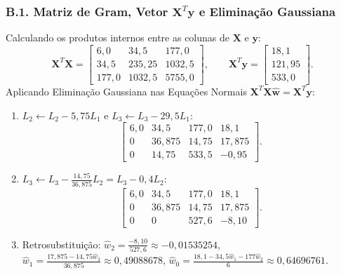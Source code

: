 \documentclass[11pt,a4paper]{article}
\begin{document}
\subsubsection*{B.1. Matriz de Gram, Vetor $\mathbf{X}^T\mathbf{y}$ e Eliminação Gaussiana}
Calculando os produtos internos entre as colunas de $\mathbf{X}$ e $\mathbf{y}$:
\[
\mathbf{X}^T\mathbf{X} = \begin{bmatrix}
6{,}0 & 34{,}5 & 177{,}0 \\
34{,}5 & 235{,}25 & 1032{,}5 \\
177{,}0 & 1032{,}5 & 5755{,}0
\end{bmatrix}, \qquad
\mathbf{X}^T\mathbf{y} = \begin{bmatrix} 18{,}1 \\ 121{,}95 \\ 533{,}0 \end{bmatrix}.
\]
Aplicando Eliminação Gaussiana nas Equações Normais $\mathbf{X}^T\mathbf{X}\hat{\mathbf{w}} = \mathbf{X}^T\mathbf{y}$:
\begin{enumerate}
    \item $L_2 \leftarrow L_2 - 5{,}75 L_1$ e $L_3 \leftarrow L_3 - 29{,}5 L_1$:
    \[
    \left[\begin{array}{ccc|c}
    6{,}0 & 34{,}5 & 177{,}0 & 18{,}1 \\
    0 & 36{,}875 & 14{,}75 & 17{,}875 \\
    0 & 14{,}75 & 533{,}5 & -0{,}95
    \end{array}\right].
    \]
    \item $L_3 \leftarrow L_3 - \frac{14{,}75}{36{,}875}L_2 = L_3 - 0{,}4 L_2$:
    \[
    \left[\begin{array}{ccc|c}
    6{,}0 & 34{,}5 & 177{,}0 & 18{,}1 \\
    0 & 36{,}875 & 14{,}75 & 17{,}875 \\
    0 & 0 & 527{,}6 & -8{,}10
    \end{array}\right].
    \]
    \item Retrosubstituição: $\hat{w}_2 = \frac{-8{,}10}{527{,}6} \approx -0{,}01535254$, $\hat{w}_1 = \frac{17{,}875 - 14{,}75\hat{w}_2}{36{,}875} \approx 0{,}49088678$, $\hat{w}_0 = \frac{18{,}1 - 34{,}5\hat{w}_1 - 177\hat{w}_2}{6} \approx 0{,}64696761$.
\end{enumerate}
\end{document}
